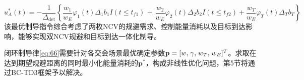 \begin{equation}
\label{eq:66}
u_A^*(t) =  - \frac{1}{{{\Delta _{{\text{det}}}}}}\left\{ {\frac{{{w_1}}}{{{w_E}}}{\varphi _1}(t){\Delta _1}{b_1}I(t \leqslant {t_{f1}})} \right.{\text{ + }}\left. {\frac{{{w_2}}}{{{w_E}}}{\varphi _2}(t){\Delta _2}{b_2}I(t \leqslant {t_{f2}}) + \frac{{{w_T}}}{{{w_E}}}{\varphi _T}(t){\Delta _T}{b_T}} \right\}
\end{equation}
该最优制导指令综合考虑了两枚NCV的规避需求、控制能量消耗以及目标到达影响，能够实现双NCV规避和目标到达一体化制导。

\begin{problem}[制导参数优化]
闭环制导律\eqref{eq:66}需要针对各交会场景最优确定参数${\mathbf{p}} = {[w,{\kern 1pt} \gamma ,{\kern 1pt} {w_T},{\kern 1pt} {w_E}]^T}$。求取在达到期望规避距离的同时最小化能量消耗的${{\mathbf{p}}^*}$，构成非线性优化问题，第5节将通过BC-TD3框架予以解决。
\end{problem}
